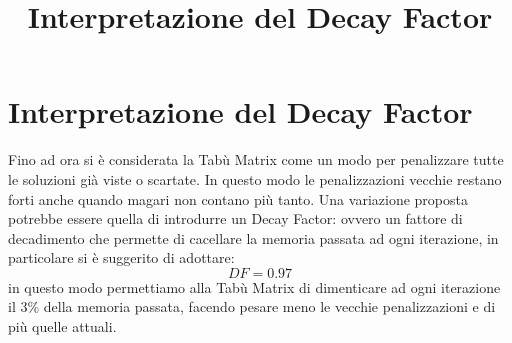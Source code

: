 \documentclass[a4paper,12pt]{article}
\title{Interpretazione del Decay Factor}
\author{}
\begin{document}
\maketitle
\newpage

\section{Interpretazione del Decay Factor}
Fino ad ora si è considerata la Tabù Matrix come un modo per penalizzare tutte le soluzioni già viste o scartate. In questo modo
le penalizzazioni vecchie restano forti anche quando magari non contano più tanto. 
Una variazione proposta potrebbe essere quella di introdurre un Decay Factor: ovvero un fattore di decadimento che permette di cacellare 
la memoria passata ad ogni iterazione, in particolare si è suggerito di adottare:
\[
    DF = 0.97
\] 
in questo modo permettiamo alla Tabù Matrix di dimenticare ad ogni iterazione il 3\% della memoria passata, facendo pesare meno le vecchie penalizzazioni
e di più quelle attuali.
\end{document}

